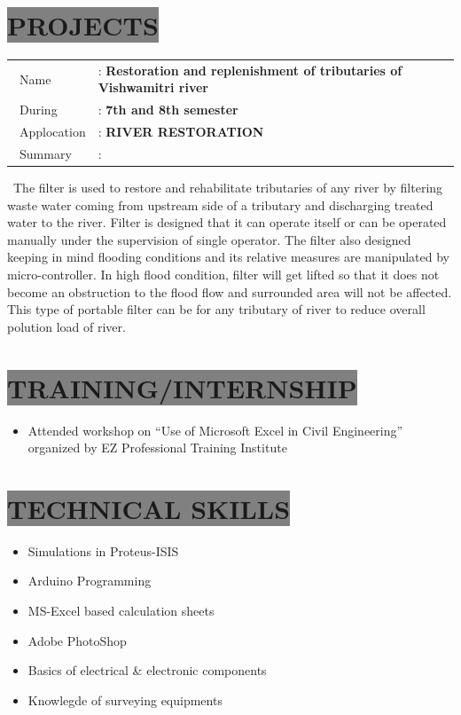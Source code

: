 \documentclass{res}
\begin{document}
\begin{resume}
\section{
\colorbox{grey}{PROJECTS}
}

\begin{tabular}{ l l}
\ Name &  {:} \textbf{Restoration and replenishment of tributaries of Vishwamitri river}\\ [0.5ex]
\ During & {:}  \textbf{7th and 8th semester} \\ [0.5ex]
\ Applocation  &  {:} \bf RIVER RESTORATION  \\ [0.5ex]
\ Summary & {:} \\
\end{tabular}

\             The filter is used to restore and rehabilitate tributaries of any river by filtering waste water coming from upstream side of a tributary and discharging treated water to the river. Filter is designed that it can operate itself or can be operated manually under the supervision of single operator. The filter also designed keeping in mind flooding conditions and its relative measures are manipulated by micro-controller. In high flood condition, filter will get lifted so that it does not become an obstruction to the flood flow and surrounded area will not be affected. This type of portable filter can be for any tributary of river to reduce overall polution load of river.  \par



 
\section{
\colorbox{grey}{TRAINING/INTERNSHIP}
}
\begin{itemize}
\item Attended workshop on “Use of Microsoft Excel in Civil Engineering” organized by EZ Professional Training Institute
\end{itemize}   



\section{
\colorbox{grey}{TECHNICAL SKILLS}       
}   
 \begin{itemize} 
 \item Simulations in Proteus-ISIS
 \item Arduino Programming
 \item MS-Excel based calculation sheets 
\item Adobe PhotoShop
\item Basics of electrical {\&} electronic components
\item Knowlegde of surveying equipments


\end{itemize}
\end{resume}
\end{document}
